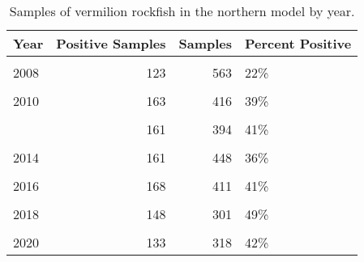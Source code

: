 \documentclass[
]{article}
\begin{document}
\begin{table}

\caption{\label{tab:tab-year-ccfrp}Samples of vermilion rockfish in the northern model by year.}
\centering
\begin{tabular}[t]{lrrl}
\toprule
Year & Positive Samples & Samples & Percent Positive\\
\midrule
\cellcolor{gray!6}{2007} & \cellcolor{gray!6}{92} & \cellcolor{gray!6}{539} & \cellcolor{gray!6}{17\%}\\
2008 & 123 & 563 & 22\%\\
\cellcolor{gray!6}{2009} & \cellcolor{gray!6}{113} & \cellcolor{gray!6}{366} & \cellcolor{gray!6}{31\%}\\
2010 & 163 & 416 & 39\%\\
\cellcolor{gray!6}{2011} & \cellcolor{gray!6}{139} & \cellcolor{gray!6}{366} & \cellcolor{gray!6}{38\%}\\
\addlinespace
2012 & 161 & 394 & 41\%\\
\cellcolor{gray!6}{2013} & \cellcolor{gray!6}{109} & \cellcolor{gray!6}{426} & \cellcolor{gray!6}{26\%}\\
2014 & 161 & 448 & 36\%\\
\cellcolor{gray!6}{2015} & \cellcolor{gray!6}{98} & \cellcolor{gray!6}{224} & \cellcolor{gray!6}{44\%}\\
2016 & 168 & 411 & 41\%\\
\addlinespace
\cellcolor{gray!6}{2017} & \cellcolor{gray!6}{155} & \cellcolor{gray!6}{366} & \cellcolor{gray!6}{42\%}\\
2018 & 148 & 301 & 49\%\\
\cellcolor{gray!6}{2019} & \cellcolor{gray!6}{164} & \cellcolor{gray!6}{306} & \cellcolor{gray!6}{54\%}\\
2020 & 133 & 318 & 42\%\\
\bottomrule
\end{tabular}
\end{table}

\FloatBarrier
\end{document}
